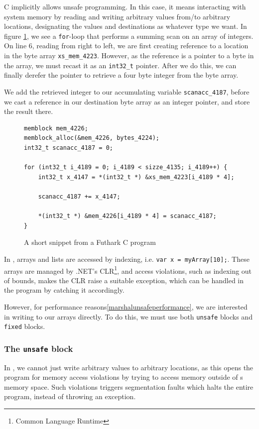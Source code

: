 C implicitly allows unsafe programming. In this case, it means interacting with system
memory by reading and writing arbitrary values from/to arbitrary locations,
designating the values and destinations as whatever type we want.
In figure \ref{fig:futharkcscene}, we see a \texttt{for}-loop that
performs a summing scan on an array of integers.
On line 6, reading from right to left, we are first creating reference to
a location in the byte array \texttt{xs\_mem\_4223}. However, as the reference
is a pointer to a byte in the array, we must recast it as an \texttt{int32\_t} pointer.
After we do this, we can finally derefer the pointer to retrieve a four byte
integer from the byte array.

We add the retrieved integer to our accumulating variable
\texttt{scanacc\_4187}, before we cast a reference in our destination byte array
as an integer pointer, and store the result there.

\begin{figure}
\centering
\begin{verbatim}
memblock mem_4226;
memblock_alloc(&mem_4226, bytes_4224);
int32_t scanacc_4187 = 0;

for (int32_t i_4189 = 0; i_4189 < sizze_4135; i_4189++) {
    int32_t x_4147 = *(int32_t *) &xs_mem_4223[i_4189 * 4];
    
    scanacc_4187 += x_4147;

    *(int32_t *) &mem_4226[i_4189 * 4] = scanacc_4187;
}
\end{verbatim}
\caption{A short snippet from a Futhark C program}
\label{fig:futharkcscene}
\end{figure} 

In \csharp{}, arrays and lists are accessed by indexing, i.e. \texttt{var
  x = myArray[10];}.
These arrays are managed by .NET's CLR\footnote{Common Language Runtime}, and
access violations, such as indexing out of bounds, makes the CLR raise a suitable
exception, which can be handled in the \csharp{} program by catching it
accordingly.

However, for performance reasons\ref{marshalunsafeperformance}, we are interested in writing to our \csharp{}
arrays directly.
To do this, we must use both \texttt{unsafe} blocks and \texttt{fixed} blocks.

\subsubsection{The \texttt{unsafe} block}
In \csharp{}, we cannot just write arbitrary values to arbitrary locations, as this
opens the program for memory access violations by trying to access memory
outside of \csharp{}s memory space. Such violations triggers segmentation faults
which halts the entire program, instead of throwing an exception.


